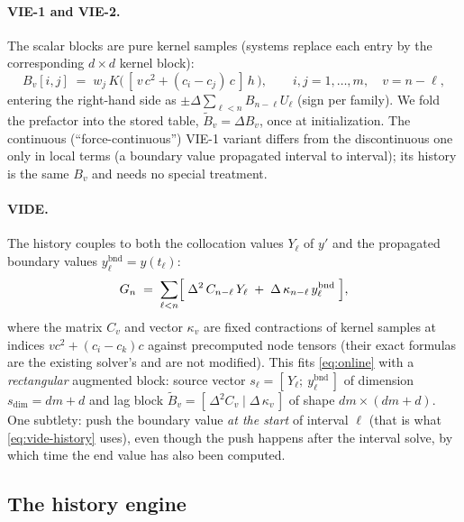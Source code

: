 \documentclass[11pt]{article}
\begin{document}
\paragraph{VIE-1 and VIE-2.} The scalar blocks are pure kernel samples
(systems replace each entry by the corresponding $d\times d$ kernel
block):
\begin{equation}
B_v[i,j] \;=\; w_j\,
K\!\bigl(\,[\,v\,c^2 + (c_i-c_j)\,c\,]\,h\,\bigr),
\qquad i,j=1,\dots,m,\quad v = n-\ell,
\label{eq:BNL}
\end{equation}
entering the right-hand side as $\pm\Delta\sum_{\ell<n}B_{n-\ell}U_\ell$
(sign per family). We fold the prefactor into the stored table,
$\widetilde B_v = \Delta B_v$, once at initialization. The continuous
(``force-continuous'') VIE-1 variant differs from the discontinuous one
only in local terms (a boundary value propagated interval to interval);
its history is the same $B_v$ and needs no special treatment.

\paragraph{VIDE.} The history couples to both the collocation values
$Y_\ell$ of $y'$ and the propagated boundary values
$y^{\mathrm{bnd}}_\ell=y(t_\ell)$:
\begin{equation}
G_n \;=\; \sum_{\ell<n}\Bigl[\;\Delta^2\, C_{n-\ell}\,Y_\ell
 \;+\; \Delta\, \kappa_{n-\ell}\, y^{\mathrm{bnd}}_\ell\;\Bigr],
\label{eq:vide-history}
\end{equation}
where the matrix $C_v$ and vector $\kappa_v$ are fixed contractions of
kernel samples at indices $v c^2 + (c_i-c_k)c$ against precomputed node
tensors (their exact formulas are the existing solver's and are not
modified). This fits \eqref{eq:online} with a \emph{rectangular}
augmented block: source vector $s_\ell = [\,Y_\ell;\
y^{\mathrm{bnd}}_\ell\,]$ of dimension $s_{\dim}=dm+d$ and lag block
$\widetilde B_v = [\,\Delta^2 C_v \;|\; \Delta\,\kappa_v\,]$ of shape
$dm\times(dm+d)$. One subtlety: push the boundary value \emph{at the
start} of interval $\ell$ (that is what \eqref{eq:vide-history} uses),
even though the push happens after the interval solve, by which time
the end value has also been computed.

\subsection{The history engine}
\label{sec:engine}
\end{document}
